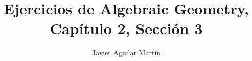 \documentclass[twoside]{article}
\begin{document}
\title{Ejercicios de Algebraic Geometry, Capítulo 2, Sección 3}
\author{Javier Aguilar Martín}
\maketitle



%
%
%
%
%
%
%


%

%
%
%
%
\end{document}
